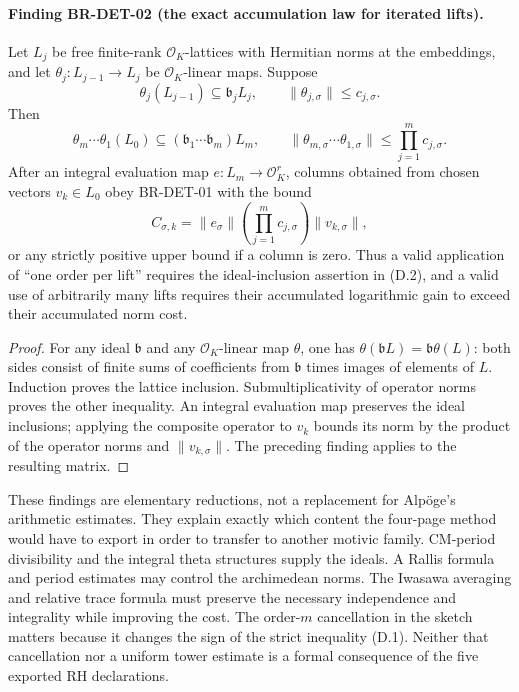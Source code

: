 \paragraph{Finding BR-DET-02 (the exact accumulation law for iterated lifts).}
Let $L_j$ be free finite-rank $\mathcal O_K$-lattices with Hermitian
norms at the embeddings, and let
$\theta_j:L_{j-1}\to L_j$ be $\mathcal O_K$-linear maps.
Suppose
\[
 \theta_j(L_{j-1})\subseteq\mathfrak b_jL_j,
 \qquad \|\theta_{j,\sigma}\|\leq c_{j,\sigma}.
\]
Then
\[
 \theta_m\cdots\theta_1(L_0)
   \subseteq(\mathfrak b_1\cdots\mathfrak b_m)L_m,
 \qquad
 \|\theta_{m,\sigma}\cdots\theta_{1,\sigma}\|
   \leq\prod_{j=1}^m c_{j,\sigma}.                            \tag{D.2}
\]
After an integral evaluation map $e:L_m\to\mathcal O_K^r$, columns
obtained from chosen vectors $v_k\in L_0$ obey BR-DET-01 with
the bound
\[
 C_{\sigma,k}=\|e_\sigma\|
       \left(\prod_{j=1}^m c_{j,\sigma}\right)\|v_{k,\sigma}\|,
\]
or any strictly positive upper bound if a column is zero.
Thus a valid application of ``one order
per lift'' requires the ideal-inclusion assertion in (D.2), and
a valid use of arbitrarily many lifts requires their accumulated
logarithmic gain to exceed their accumulated norm cost.

\begin{proof}
For any ideal $\mathfrak b$ and any $\mathcal O_K$-linear map
$\theta$, one has $\theta(\mathfrak bL)=\mathfrak b\theta(L)$:
both sides consist of finite sums of coefficients from
$\mathfrak b$ times images of elements of $L$.
Induction proves the lattice inclusion.  Submultiplicativity of
operator norms proves the other inequality.  An integral
evaluation map preserves the ideal inclusions; applying the
composite operator to $v_k$ bounds its norm by the product of
the operator norms and $\|v_{k,\sigma}\|$. The preceding
finding applies to the resulting matrix.
\end{proof}

These findings are elementary reductions, not a replacement for
Alp\"oge's arithmetic estimates.  They explain exactly which
content the four-page method would have to export in order to
transfer to another motivic family.  CM-period divisibility and
the integral theta structures supply the ideals.  A Rallis
formula and period estimates may control the archimedean norms.
The Iwasawa averaging and relative trace formula must preserve
the necessary independence and integrality while improving the
cost.  The order-$m$ cancellation in the sketch matters because
it changes the sign of the strict inequality (D.1).  Neither
that cancellation nor a uniform tower estimate is a formal
consequence of the five exported RH declarations.


